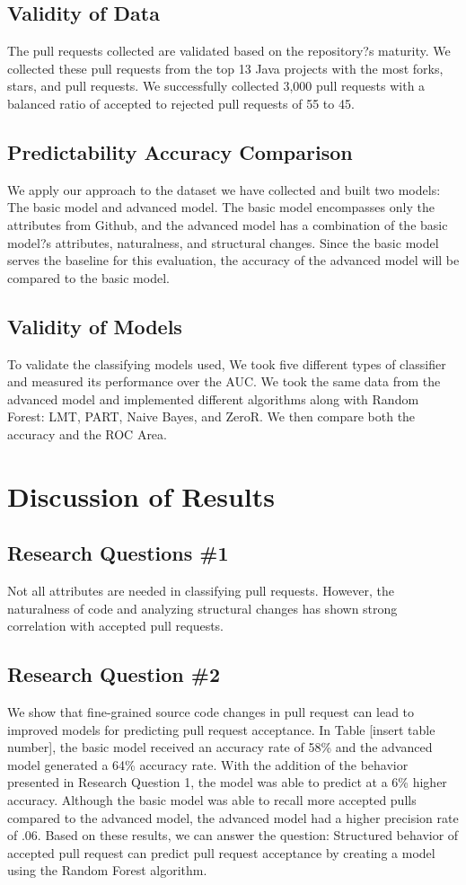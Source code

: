 \documentclass[10pt, conference]{IEEEtran}
\begin{document}
\subsection{Validity of Data}
The pull requests collected are validated based on the repository?s maturity. We collected these pull requests from the top 13 Java projects with the most forks, stars, and pull requests. We successfully collected 3,000 pull requests with a balanced ratio of accepted to rejected pull requests of 55 to 45.

\subsection{Predictability Accuracy Comparison}
We apply our approach to the dataset we have collected and built two models: The basic model and advanced model. The basic model encompasses only the attributes from Github, and the advanced model has a combination of the basic model?s attributes, naturalness, and structural changes. Since the basic model serves the baseline for this evaluation, the accuracy of the advanced model will be compared to the basic model. 

\subsection{Validity of Models}
To validate the classifying models used, We took five different types of classifier and measured its performance over the AUC. We took the same data from the advanced model and implemented different algorithms along with Random Forest: LMT, PART, Naive Bayes, and ZeroR. We then compare both the accuracy and the ROC Area.

\section{Discussion of Results}
\subsection{Research Questions \#1}
Not all attributes are needed in classifying pull requests. However, the naturalness of code and analyzing structural changes has shown strong correlation with accepted pull requests. 

\subsection{Research Question \#2}
We show that fine-grained source code changes in pull request can lead to improved models for predicting pull request acceptance. In Table [insert table number], the basic model received an accuracy rate of 58\% and the advanced model generated a 64\% accuracy rate. With the addition of the behavior presented in Research Question 1, the model was able to predict at a 6\% higher accuracy. Although the basic model was able to recall more accepted pulls compared to the advanced model, the advanced model had a higher precision rate of .06. Based on these results, we can answer the question: Structured behavior of accepted pull request can predict pull request acceptance by creating a model using the Random Forest algorithm.
\end{document}
